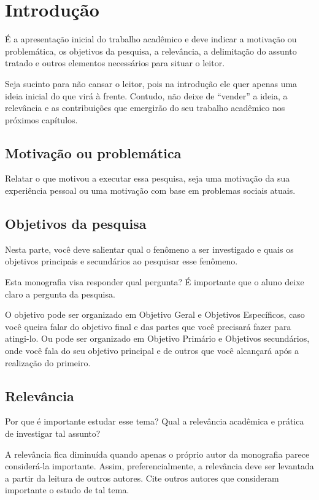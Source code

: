 \chapter{Introdução}

É a apresentação inicial do trabalho acadêmico e deve indicar a motivação ou problemática, os objetivos da pesquisa, a relevância, a delimitação do assunto tratado e outros elementos necessários para situar o leitor.

Seja sucinto para não cansar o leitor, pois na introdução ele quer apenas uma ideia inicial do que virá à frente. Contudo, não deixe de “vender” a ideia, a relevância e as contribuições que emergirão do seu trabalho acadêmico nos próximos capítulos.

\section{Motivação ou problemática}

Relatar o que motivou a executar essa pesquisa, seja uma motivação da sua experiência pessoal ou uma motivação com base em problemas sociais atuais.

\section{Objetivos da pesquisa}

Nesta parte, você deve salientar qual o fenômeno a ser investigado e quais os objetivos principais e secundários ao pesquisar esse fenômeno.

Esta monografia visa responder qual pergunta? É importante que o aluno deixe claro a pergunta da pesquisa.

O objetivo pode ser organizado em Objetivo Geral e Objetivos Específicos, caso você queira falar do objetivo final e das partes que você precisará fazer para atingi-lo. Ou pode ser organizado em Objetivo Primário e Objetivos secundários, onde você fala do seu objetivo principal e de outros que você alcançará após a realização do primeiro.

\section{Relevância}

Por que é importante estudar esse tema? Qual a relevância acadêmica e prática de investigar tal assunto? 

A relevância fica diminuída quando apenas o próprio autor da monografia parece considerá-la importante. Assim, preferencialmente, a relevância deve ser levantada a partir da leitura de outros autores. Cite outros autores que consideram importante o estudo de tal tema.

